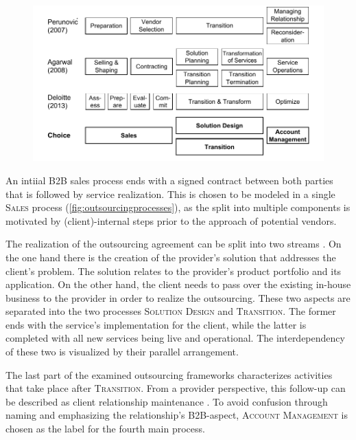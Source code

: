 		\begin{figure}[caption={Outsourcing Process Framework Comparison}, label={fig:outsourcingprocesses}]
		{	\includegraphics[width=.95\textwidth]{figures/outsourcingprocs.pdf}}
	\end{figure} 

	An intiial B2B sales process ends with a signed contract between both parties that is followed by service realization. This is chosen to be modeled in a single \textsc{Sales} process (\cf \Fig \ref{fig:outsourcingprocesses}), as the split into multiple components is motivated by (client)-internal steps prior to the approach of potential vendors. 
	
	The realization of the outsourcing agreement can be split into two streams \citep{Agarwal_2008}. On the one hand there is the creation of the provider's solution that addresses the client's problem. The solution relates to the provider's product portfolio and its application. On the other hand, the client needs to pass over the existing in-house business to the provider in order to realize the outsourcing. These two aspects are separated into the two processes \textsc{Solution Design} and \textsc{Transition}. The former ends with the service's implementation for the client, while the latter is completed with all new services being live and operational. The interdependency of these two is visualized by their parallel arrangement. 
	
	The last part of the examined outsourcing frameworks characterizes activities that take place after \textsc{Transition}. From a provider perspective, this follow-up can be described as client relationship maintenance \citep{Moncrief_2005}. 
	To avoid confusion through naming and emphasizing the relationship's B2B-aspect, \textsc{Account Management} is chosen as the label for the fourth main process.

	
	
